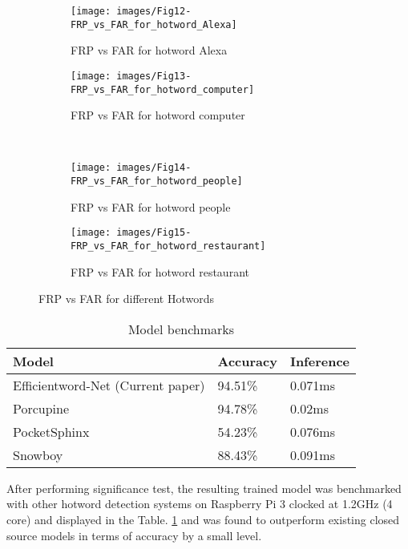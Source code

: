 \documentclass[10pt,twocolumn]{article}
\begin{document}
\begin{figure*}[htbp]
\begin{subfigure}{.5\textwidth}
  \centering
  \texttt{[image: images/Fig12-FRP\_vs\_FAR\_for\_hotword\_Alexa]}  
  \caption{FRP vs FAR for hotword Alexa}
  \label{FIG:FRPvsFARalexa}
\end{subfigure}
\begin{subfigure}{.5\textwidth}
  \centering
  \texttt{[image: images/Fig13-FRP\_vs\_FAR\_for\_hotword\_computer]}  
  \caption{FRP vs FAR for hotword computer}
  \label{FIG:FRPvsFARcomputer}
\end{subfigure}\\
\begin{subfigure}{.5\textwidth}
  \centering
  \texttt{[image: images/Fig14-FRP\_vs\_FAR\_for\_hotword\_people]}  
\caption{FRP vs FAR for hotword people}
 \label{FIG:FRPvsFARpeople}
  \end{subfigure}
\begin{subfigure}{.5\textwidth}
  \centering
 \texttt{[image: images/Fig15-FRP\_vs\_FAR\_for\_hotword\_restaurant]}  
\caption{FRP vs FAR for hotword restaurant}
  \label{FIG:FRPvsFARrestaurant}
  \end{subfigure}
\caption{FRP vs FAR for different Hotwords}
\label{fig:frp_vs_far}
\end{figure*}


\begin{table}
\centering
\caption{Model benchmarks}
\label{TBL:Model_benchmarks}
\begin{tabular}{ p{2cm} p{2cm}   p{2cm}}
 \hline \hline
Model   &Accuracy &Inference \\
 \hline
Efficientword-Net (Current paper) &94.51\%   &0.071ms \\
Porcupine \cite{picovoice_alireza} &94.78\% &0.02ms \\
PocketSphinx \cite{kalith_2012} &54.23\% &0.076ms \\
Snowboy \cite{Yang_Jee_Leblanc_Weaver_Armand_2020} &88.43\% &0.091ms \\
\hline
\end{tabular}
\end{table}%

After performing significance test, the resulting trained model was benchmarked with other hotword detection systems on Raspberry Pi 3 clocked at 1.2GHz (4 core) and displayed in the Table. \ref{TBL:Model_benchmarks} and was found to outperform existing closed source models in terms of accuracy by a small level.
\end{document}
